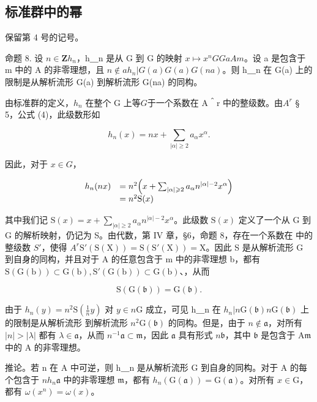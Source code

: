 \subsection{标准群中的幂}

保留第 4 号的记号。

命题 8. 设 \(n \in \mathbf{Z}\)\(h_n\)，h＿n 是从 G 到 G 的映射 \(x \mapsto x^n\)\(G\)\(G\)\(a\)\(A\)\(m\)。设 a 是包含于 m 中的 A 的非零理想，且 \(n \notin a\)\(h_n|G(a)\)\(G(a)\)\(G(na)\)。则 h＿n 在 G(a) 上的限制是从解析流形 G(a) 到解析流形 G(na) 的同构。

由标准群的定义，\(h_n\) 在整个 G 上等\(G\)于一个系数在 A＾r 中的整级数。由\(A^r\) § 5，公式 (4)，此级数形如

\[
h _ {n} (x) = n x + \sum_ {| \alpha | \geqslant 2} a _ {\alpha} x ^ {\alpha}.
\]

因此，对于 \(x \in G\)，

\[
\begin{array}{r l} h _ {n} (n x) & = n ^ {2} \Big (x + \sum_ {| \alpha | \geqslant 2} a _ {\alpha} n ^ {| \alpha | - 2} x ^ {\alpha} \Big) \\ & = n ^ {2} \mathrm{S} (x) \end{array}
\]

其中我们记 \(\mathrm{S}(x)=x+\sum_{|\alpha| \geq 2} a_{\alpha} n^{|\alpha|-2} x^{\alpha}\)。此级数 \(\mathrm{S}(x)\) 定义了一个从 G 到 G 的解析映射，仍记为 S。由代数，第 IV 章，§6，命题 8，存在一个系数在  中的整级数 \(S'\)，使得 \(A^r\)\(\mathrm{S}'(\mathrm{S}(\mathrm{X}))=\mathrm{S}(\mathrm{S}'(\mathrm{X}))=\mathrm{X}\)。因此 S 是从解析流形 G 到自身的同构，并且对于 A 的任意包含于 m 中的非零理想 b，都有 \(\mathrm{S}(\mathrm{G}(\mathrm{b}))\subset\mathrm{G}(\mathrm{b}),\mathrm{S}'(\mathrm{G}(\mathrm{b}))\subset\mathrm{G}(\mathrm{b})\)、，从而

\[
\mathrm{S} (\mathrm{G} (\mathfrak {b})) = \mathrm{G} (\mathfrak {b}).
\]

由于 \(h_n(y) = n^2\mathrm{S}\left(\frac{1}{n} y\right)\) 对 \(y \in n\mathrm{G}\) 成立，可见 h＿n 在 \(h_n|n\mathrm{G}(\mathfrak{b})\)\(n\mathrm{G}(\mathfrak{b})\) 上的限制是从解析流形  到解析流形 \(n^2\mathrm{G}(\mathfrak{b})\) 的同构。但是，由于 \(n \notin \mathfrak{a}\)，对所有 \(|n| > |\lambda|\) 都有 \(\lambda \in \mathfrak{a}\)，从而 \(n^{-1}\mathfrak{a} \subset \mathfrak{m}\)，因此 \(\mathfrak{a}\) 具有形式 \(n\mathfrak{b}\)，其中 \(\mathfrak{b}\) 是包含于 \(\mathrm{A}\)\(\mathfrak{m}\) 中的 A 的非零理想。

推论。若 n 在 A 中可逆，则 h＿n 是从解析流形 G 到自身的同构。对于 A 的每个包含于 \(n\)\(h_n\)\(\mathfrak{a}\) 中的非零理想 \(\mathfrak{m}\)，都有 \(h_n(\mathrm{G}(\mathfrak{a})) = \mathrm{G}(\mathfrak{a})\)。对所有 \(x \in \mathrm{G}\)，都有 \(\omega(x^n) = \omega(x)\)。

